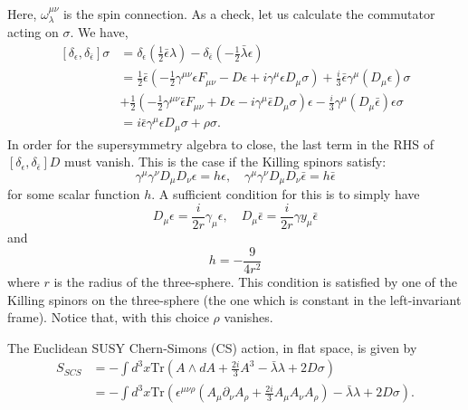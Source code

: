 Here, $\omega_\lambda^{\mu\nu}$ is the spin connection. As a check, let us
calculate the commutator acting on $\sigma$. We have,
\begin{align}
  \left[\delta_\epsilon, \delta_{\bar{\epsilon}}\right]\sigma
  &= \delta_\epsilon\left(\frac{1}{2}\bar{\epsilon}\lambda\right)
  - \delta_{\bar{\epsilon}}\left(-\frac{1}{2}\bar{\lambda}\epsilon\right)\nonumber\\
  &=\frac{1}{2}\bar{\epsilon}\left(-\frac{1}{2}\gamma^{\mu\nu}\epsilon
    F_{\mu\nu}
  - D\epsilon + i\gamma^\mu\epsilon D_\mu \sigma\right)
  + \frac{i}{3}\bar{\epsilon}\gamma^{\mu}(D_\mu\epsilon)\sigma\nonumber\\
  &+ \frac{1}{2}(-\frac{1}{2}\gamma^{\mu\nu}\bar{\epsilon}F_{\mu\nu}
  + D\epsilon - i\gamma^{\mu}\bar{\epsilon}D_\mu\sigma)\epsilon
  - \frac{i}{3}\gamma^\mu(D_\mu\bar{\epsilon})\epsilon\sigma\nonumber\\
  &= i\bar{\epsilon}\gamma^\mu\epsilon D_\mu\sigma + \rho\sigma.
\end{align}
In order for the supersymmetry algebra to close, the last term in the RHS of
$\left[\delta_\epsilon, \delta_{\bar{\epsilon}}\right]D$ must vanish. This is
the case if the Killing spinors satisfy:
\begin{equation}
  \gamma^\mu\gamma^\nu D_\mu D_\nu\epsilon = h\epsilon,\quad
  \gamma^\mu\gamma^\nu D_\mu D_\nu \bar{\epsilon} = h\bar{\epsilon}
  \label{eq:spinorrequirement}
\end{equation}
for some scalar function $h$. A sufficient condition for this is to simply have
\begin{equation}
  D_\mu\epsilon = \frac{i}{2r}\gamma_\mu\epsilon, \quad
  D_\mu\bar{\epsilon}=\frac{i}{2r}\gamma y_\mu\bar{\epsilon}
\end{equation}
and
\begin{equation}
  h = - \frac{9}{4r^2}
  \label{eq:equationh}
\end{equation}
where $r$ is the radius of the three-sphere. This condition is satisfied by one
of the Killing spinors on the three-sphere (the one which is constant in the
left-invariant frame). Notice that, with this choice $\rho$ vanishes.
\par The Euclidean SUSY Chern-Simons (CS) action, in flat space, is given by
\begin{align}
  S_{SCS} &= - \int d^3x \mathrm{Tr}\left(A\wedge dA + \frac{2i}{3}A^3
    - \bar{\lambda}\lambda + 2D\sigma\right)\\
    &= -\int d^3x
    \mathrm{Tr}\left(\epsilon^{\mu\nu\rho}\left(A_\mu\partial_\nu A_\rho
      + \frac{2i}{3}A_\mu A_\nu A_\rho\right)
    - \bar{\lambda}{\lambda}+2D\sigma\right).
  \end{align}

